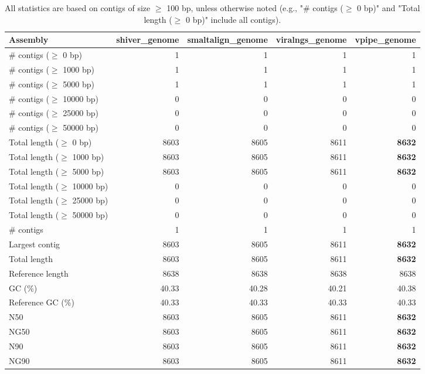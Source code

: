 \documentclass[12pt,a4paper]{article}
\begin{document}
\begin{table}[ht]
\begin{center}
\caption{All statistics are based on contigs of size $\geq$ 100 bp, unless otherwise noted (e.g., "\# contigs ($\geq$ 0 bp)" and "Total length ($\geq$ 0 bp)" include all contigs).}
\begin{tabular}{|l*{4}{|r}|}
\hline
Assembly & shiver\_genome & smaltalign\_genome & viralngs\_genome & vpipe\_genome \\ \hline
\# contigs ($\geq$ 0 bp) & 1 & 1 & 1 & 1 \\ \hline
\# contigs ($\geq$ 1000 bp) & 1 & 1 & 1 & 1 \\ \hline
\# contigs ($\geq$ 5000 bp) & 1 & 1 & 1 & 1 \\ \hline
\# contigs ($\geq$ 10000 bp) & 0 & 0 & 0 & 0 \\ \hline
\# contigs ($\geq$ 25000 bp) & 0 & 0 & 0 & 0 \\ \hline
\# contigs ($\geq$ 50000 bp) & 0 & 0 & 0 & 0 \\ \hline
Total length ($\geq$ 0 bp) & 8603 & 8605 & 8611 & {\bf 8632} \\ \hline
Total length ($\geq$ 1000 bp) & 8603 & 8605 & 8611 & {\bf 8632} \\ \hline
Total length ($\geq$ 5000 bp) & 8603 & 8605 & 8611 & {\bf 8632} \\ \hline
Total length ($\geq$ 10000 bp) & 0 & 0 & 0 & 0 \\ \hline
Total length ($\geq$ 25000 bp) & 0 & 0 & 0 & 0 \\ \hline
Total length ($\geq$ 50000 bp) & 0 & 0 & 0 & 0 \\ \hline
\# contigs & 1 & 1 & 1 & 1 \\ \hline
Largest contig & 8603 & 8605 & 8611 & {\bf 8632} \\ \hline
Total length & 8603 & 8605 & 8611 & {\bf 8632} \\ \hline
Reference length & 8638 & 8638 & 8638 & 8638 \\ \hline
GC (\%) & 40.33 & 40.28 & 40.21 & 40.38 \\ \hline
Reference GC (\%) & 40.33 & 40.33 & 40.33 & 40.33 \\ \hline
N50 & 8603 & 8605 & 8611 & {\bf 8632} \\ \hline
NG50 & 8603 & 8605 & 8611 & {\bf 8632} \\ \hline
N90 & 8603 & 8605 & 8611 & {\bf 8632} \\ \hline
NG90 & 8603 & 8605 & 8611 & {\bf 8632} \\ \hline

\end{tabular}
\end{center}
\end{table}
\end{document}
